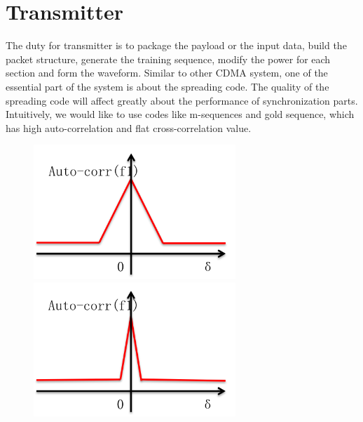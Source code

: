 \section{Transmitter} %
\label{sec:transmitter}
The duty for transmitter is to package the payload or the input data, build the packet structure, generate the training sequence, modify the power for each section and form the waveform. Similar to other CDMA system, one of the essential part of the system is about the spreading code. The quality of the spreading code will affect greatly about the performance of synchronization parts. Intuitively, we would like to use codes like m-sequences and gold sequence, which has high auto-correlation and flat cross-correlation value.

\begin{figure}
	\includegraphics[width = 3in]{figure/bad_correlation.png}
	\includegraphics[width = 3in]{figure/good_correlation.png}
\end{figure}

